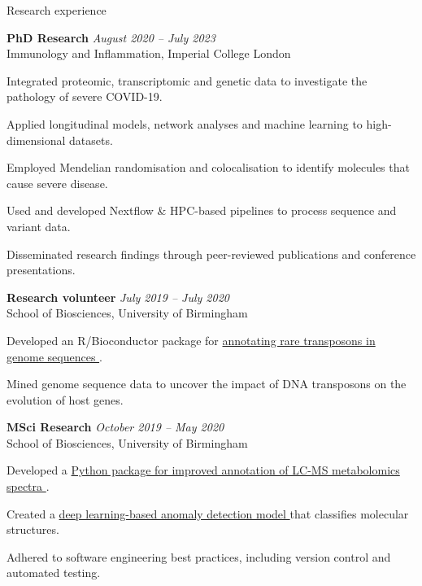 \documentclass{resume}
\begin{document}
\begin{rSection}{Research experience}

\vspace{1pt plus 1pt}

\textbf{PhD Research} \hfill \textit{August 2020 -- July 2023} \\
Immunology and Inflammation, Imperial College London

\vspace{2pt plus 1pt minus 1pt}
\item Integrated proteomic, transcriptomic and genetic data to investigate the pathology of severe COVID-19.
\item Applied longitudinal models, network analyses and machine learning to high-dimensional datasets.
\item Employed Mendelian randomisation and colocalisation to identify molecules that cause severe disease.
\item Used and developed Nextflow \& HPC-based pipelines to process sequence and variant data.
\item Disseminated research findings through peer-reviewed publications and conference presentations. 

\textbf{Research volunteer} \hfill \textit{July 2019 -- July 2020} \\
School of Biosciences, University of Birmingham

\vspace{2pt plus 1pt minus 1pt}
\item Developed an R/Bioconductor package for \href{https://bioconductor.org/packages/release/bioc/html/packFinder.html}{annotating rare transposons in genome sequences \faGithub}.
\item Mined genome sequence data to uncover the impact of DNA transposons on the evolution of host genes.

\textbf{MSci Research} \hfill \textit{October 2019 -- May 2020} \\
School of Biosciences, University of Birmingham

\vspace{2pt plus 1pt minus 1pt}
\item Developed a \href{https://github.com/jackgisby/metaboblend}{Python package for improved annotation of LC-MS metabolomics spectra \faGithub}.
\item Created a \href{https://github.com/jackgisby/deepmet}{deep learning-based anomaly detection model \faGithub} that classifies molecular structures.
\item Adhered to software engineering best practices, including version control and automated testing.


\end{rSection}
\end{document}
